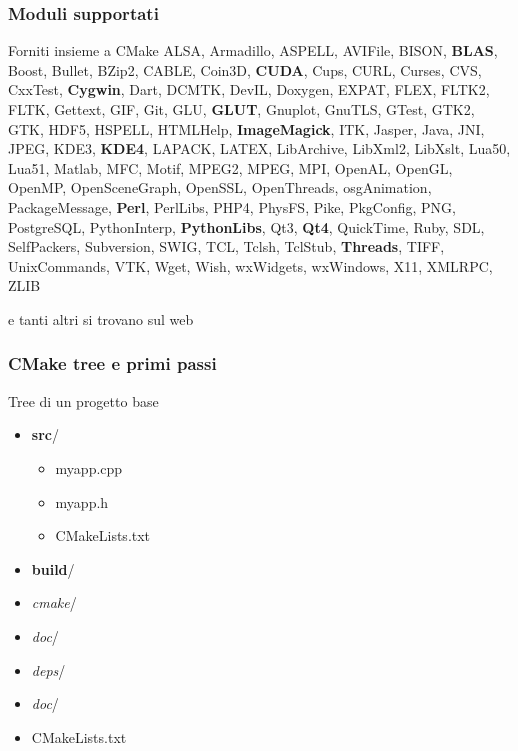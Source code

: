 \documentclass[10pt] {beamer}
\begin{document}

\begin{frame}[fragile]
 \frametitle{Moduli supportati}
\begin{block}{Forniti insieme a CMake}
 ALSA, Armadillo, ASPELL, AVIFile, BISON, \textbf{BLAS}, Boost, Bullet, BZip2, CABLE, 
 Coin3D, \textbf{CUDA}, Cups, CURL, Curses, CVS, CxxTest, \textbf{Cygwin}, Dart, DCMTK, 
 DevIL, Doxygen, EXPAT, FLEX, FLTK2, FLTK, Gettext,
 GIF, Git, GLU, \textbf{GLUT}, Gnuplot, GnuTLS, GTest, GTK2, GTK, HDF5, HSPELL, 
 HTMLHelp, \textbf{ImageMagick}, ITK, Jasper, Java, JNI, JPEG, KDE3, \textbf{KDE4}, LAPACK, LATEX, 
 LibArchive, LibXml2, LibXslt, Lua50, Lua51, Matlab, MFC, Motif, MPEG2, MPEG, MPI, 
 OpenAL, OpenGL, OpenMP, OpenSceneGraph, OpenSSL, OpenThreads, osgAnimation,  
PackageMessage, \textbf{Perl}, PerlLibs, PHP4, PhysFS, Pike, PkgConfig, PNG, PostgreSQL,  PythonInterp, 
 \textbf{PythonLibs}, Qt3, \textbf{Qt4}, QuickTime, Ruby, SDL, SelfPackers, Subversion, 
 SWIG, TCL, Tclsh, TclStub, \textbf{Threads}, TIFF, UnixCommands, VTK, Wget, 
 Wish, wxWidgets, wxWindows, X11, XMLRPC, ZLIB
\end{block}
e tanti altri si trovano sul web
\end{frame}

\begin{frame}[fragile]
\frametitle{CMake tree e primi passi}

\begin{block}{Tree di un progetto base}
\begin{itemize}
\item \textbf{src}/
\begin{itemize}
	\item myapp.cpp
	\item myapp.h
	\item CMakeLists.txt
\end{itemize}
\item \textbf{build}/
\item \emph{cmake}/
\item \emph{doc}/
\item \emph{deps}/
\item \emph{doc}/
\item CMakeLists.txt
\end{itemize}
\end{block}
\end{frame}
\end{document}
